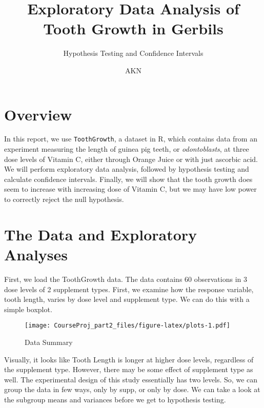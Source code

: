 \documentclass[]{article}
\title{Exploratory Data Analysis of Tooth Growth in Gerbils}
\subtitle{Hypothesis Testing and Confidence Intervals}
\author{AKN}
\date{}
\newenvironment{Shaded}{\begin{snugshade}}{\end{snugshade}}
\newcommand{\KeywordTok}[1]{\textcolor[rgb]{0.13,0.29,0.53}{\textbf{{#1}}}}
\newcommand{\StringTok}[1]{\textcolor[rgb]{0.31,0.60,0.02}{{#1}}}
\newcommand{\NormalTok}[1]{{#1}}
\begin{document}
\maketitle


\section{Overview}\label{overview}

In this report, we use \texttt{ToothGrowth}, a dataset in R, which
contains data from an experiment measuring the length of guinea pig
teeth, or \emph{odontoblasts}, at three dose levels of Vitamin C, either
through Orange Juice or with just ascorbic acid. We will perform
exploratory data analysis, followed by hypothesis testing and calculate
confidence intervals. Finally, we will show that the tooth growth does
seem to increase with increasing dose of Vitamin C, but we may have low
power to correctly reject the null hypothesis.

\section{The Data and Exploratory
Analyses}\label{the-data-and-exploratory-analyses}

First, we load the ToothGrowth data. The data contains 60 observations
in 3 dose levels of 2 supplement types. First, we examine how the
response variable, tooth length, varies by dose level and supplement
type. We can do this with a simple boxplot.

\begin{Shaded}
\end{Shaded}

\begin{figure}[htbp]
\centering
\texttt{[image: CourseProj\_part2\_files/figure-latex/plots-1.pdf]}
\caption{Data Summary}
\end{figure}

Visually, it looks like Tooth Length is longer at higher dose levels,
regardless of the supplement type. However, there may be some effect of
supplement type as well. The experimental design of this study
essentially has two levels. So, we can group the data in few ways, only
by supp, or only by dose. We can take a look at the subgroup means and
variances before we get to hypothesis testing.
\end{document}
